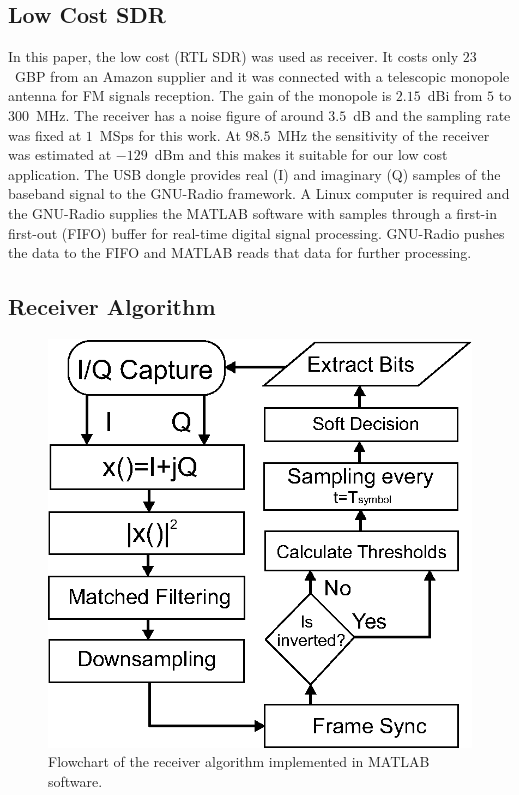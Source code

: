 \documentclass[journal]{IEEEtran}
\begin{document}
\subsection{Low Cost SDR}
%
In this paper, the low cost  (RTL SDR)  \cite{NESDR} was used as receiver. 
%
It costs only $23$~GBP from an Amazon supplier and it  was connected with a telescopic monopole antenna  for FM signals reception. 
%
The gain of the monopole is  $2.15$~dBi from $5$ to $300$~MHz. 
%
The receiver  has a noise figure of around $3.5$~dB and the sampling rate was fixed at $1$~MSps for this work.
%
At $98.5$~MHz the sensitivity of the receiver was estimated at $-129$~dBm \cite{clarke2014maximizing}  and this makes it suitable for our low cost application. 
%
The USB dongle provides real (I) and imaginary (Q) samples of the baseband signal to the GNU-Radio framework. 
%
A Linux computer is required and the GNU-Radio  supplies the MATLAB software with samples through a  first-in  first-out (FIFO) buffer  for real-time digital signal processing. 
%
GNU-Radio pushes the data to the FIFO and MATLAB reads that data for further processing.
%
\subsection{Receiver Algorithm}
%
\begin{figure}[t]
\centering
\includegraphics[width=0.65\columnwidth]{Figures/Fig9.eps}
\caption{Flowchart of the receiver algorithm implemented in MATLAB software.}
\label{fig:flowchart}
\end{figure}
\end{document}
